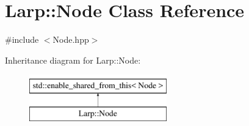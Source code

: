 \hypertarget{classLarp_1_1Node}{}\section{Larp\+:\+:Node Class Reference}
\label{classLarp_1_1Node}


{\ttfamily \#include $<$Node.\+hpp$>$}

Inheritance diagram for Larp\+:\+:Node\+:\begin{figure}[H]
\begin{center}
\leavevmode
\includegraphics[height=2.000000cm]{classLarp_1_1Node}
\end{center}
\end{figure}
